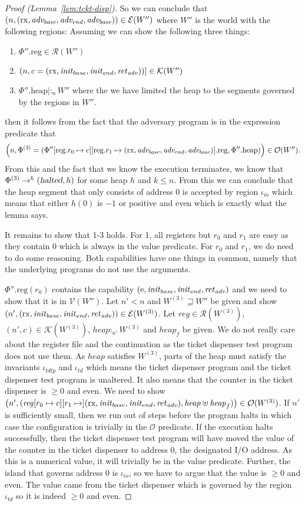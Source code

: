 \documentclass[a4paper]{article}
\newcommand{\update}[2]{[#1 \mapsto #2]}
\newcommand{\var}[1]{\mathit{#1}}
\newcommand{\reg}{\var{reg}}
\newcommand{\heap}{\var{heap}}
\newcommand{\plainproj}[1]{\mathrm{#1}}
\newcommand{\memheap}[1][\Phi]{#1.\plainproj{heap}}
\newcommand{\memreg}[1][\Phi]{#1.\plainproj{reg}}
\newcommand{\updateReg}[3][\Phi]{#1\update{\plainproj{reg}.#2}{#3}}
\newcommand{\halted}{\textsl{halted}}
\newcommand{\future}{\mathbin{\sqsupseteq}}
\newcommand{\heapSat}[3][\heap]{#1 :_{#2} #3}
\newcommand{\asmType}{\plaindom{AsmType}}
\newcommand{\plaindom}[1]{\mathrm{#1}}
\newcommand{\intr}[2]{\mathcal{#1}}
\newcommand{\valueintr}[1]{\intr{V}{#1}}
\newcommand{\exprintr}[1]{\intr{E}{#1}}
\newcommand{\contintr}[1]{\intr{K}{#1}}
\newcommand{\regintr}[1]{\intr{R}{#1}}
\newcommand{\stdvr}{\valueintr{\asmType}}
\newcommand{\stder}{\exprintr{\asmType}}
\newcommand{\stdrr}{\regintr{\asmType}}
\newcommand{\stdkr}{\contintr{\asmType}}
\newcommand{\observations}{\mathcal{O}}
\newcommand{\npair}[2][n]{\left(#1,#2 \right)}
\newcommand{\plainperm}[1]{\mathrm{#1}}
\newcommand{\exec}{\plainperm{rx}}
\newcommand{\entry}{\plainperm{e}}
\newcommand{\step}[1][]{\rightarrow_{#1}}
\begin{document}
\begin{proof}[Proof (Lemma~\ref{lem:tckt-disp})]
So we can conclude that $\npair{(\exec,\advb,\adve,\advb}) \in \stder(W'')$ where $W''$ is the world with the following regions:
Assuming we can show the following three things:
\begin{enumerate}
\item $\memreg[\Phi''] \in \stdrr(W'')$
\item $\npair{c = (\exec,\initb,\inite,\reta)}] \in \stdkr(W'')$
\item $\heapSat[{\memheap[\Phi'']}|]{n}{W''}$ where the we have limited the heap to the segments governed by the regions in $W''$.
\end{enumerate}
then it follows from the fact that the adversary program is in the expression predicate that
\[
\npair{\Phi^{(3)} = (\updateReg[\Phi'']{r_0}{c}[\plainproj{reg}.r_1 \mapsto (\exec,\advb,\adve,\advb)].\plainproj{reg},\memheap[\Phi''])} \in \observations(W'').
\]
From this and the fact that we know the execution terminates, we know that $\Phi^{(3)} \step^k (\halted,h)$ for some heap $h$ and $k \leq n$. From this we can conclude that the heap segment that only consists of address 0 is accepted by region $\iota_{\var{io}}$ which means that either $h(0)$ is $-1$ or positive and even which is exactly what the lemma says.

It remains to show that 1-3 holds. For 1, all registers but $r_0$ and $r_1$ are easy as they contain $0$ which is always in the value predicate. For $r_0$ and $r_1$, we do need to do some reasoning. Both capabilities have one things in common, namely that the underlying programs do not use the arguments.

$\memreg[\Phi''](r_0)$ contains the capability $(\entry,\initb,\inite,\reta)$ and we need to show that it is in $\stdvr(W'')$. Let $n' < n$ and $W^{(3)} \future W''$ be given and show $\npair[n']{(\exec,\initb,\inite,\reta)} \in \stder(W^{(3)})$. Let $\reg \in \stdrr(W^{(3)})$, $\npair[n']{c} \in \stdkr(W^{(3)})$, $\heapSat[\heap]{n'}{W^{(3)}}$ and $\heap_f$ be given. We do not really care about the register file and the continuation as the ticket dispenser test program does not use them. As $\heap$ satisfies $W^{(3)}$, parts of the heap must satisfy the invariants $\iota_{\var{tdtp}}$ and $\iota_{\var{td}}$ which means the ticket dispenser program and the ticket dispenser test program is unaltered. It also means that the counter in the ticket dispenser is $\geq 0$ and even. We need to show $\npair[n']{(\reg[r_0 \mapsto c][r_1 \mapsto ](\exec,\initb,\inite,\reta), \heap \uplus \heap_f)} \in \observations(W^{(3)})$. If $n'$ is sufficiently small, then we run out of steps before the program halts in which case the configuration is trivially in the $\observations$ predicate. If the execution halts successfully, then the ticket dispenser test program will have moved the value of the counter in the ticket dispenser to address 0, the designated I/O address. As this is a numerical value, it will trivially be in the value predicate. Further, the island that governs address 0 is $\iota_{\var{io}}$, so we have to argue that the value is $\geq 0$ and even. The value came from the ticket dispenser which is governed by the region $\iota_{\var{td}}$ so it is indeed $\geq 0$ and even.


\end{proof}
\end{document}

